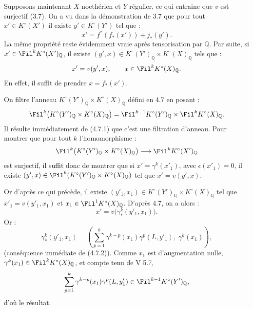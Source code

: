 Supposons maintenant \(X\) noethérien et \(Y\) régulier, ce qui entraine que \(v\) est surjectif (3.7). On a vu dans la démonstration de 3.7 que pour tout \(x'\in K^\circ(X')\) il existe \(y'\in K^\circ(Y')\) tel que :
\[
  x'=f^*(f_*(x'))+j_*(y').
\]
La même propriété reste évidemment vraie après tensorisation par \(\mathbb Q\). Par suite, si \(x'\in\Fil^kK^\circ(X')_{\mathbb Q}\), il existe \((y',x)\in K^\circ(Y')_{\mathbb Q}\times K^\circ(X)_{\mathbb Q}\) tels que :
\[
  x'=v(y',x),\qquad x\in\Fil^kK^\circ(X)_{\mathbb Q}.
\]
En effet, il suffit de prendre \(x=f_*(x')\).

On filtre l'anneau \(K^\circ(Y')_{\mathbb Q}\times K^\circ(X)_{\mathbb Q}\) défini en 4.7 en posant :
\[
  \Fil^k\bigl(K^\circ(Y')_{\mathbb Q}\times K^\circ(X)_{\mathbb Q}\bigr)
  =
  \Fil^{k-1}K^\circ(Y')_{\mathbb Q}\times \Fil^kK^\circ(X)_{\mathbb Q}.
\]
Il résulte immédiatement de (4.7.1) que c'est une filtration d'anneau. Pour montrer que pour tout \(k\) l'homomorphisme :
\[
  \Fil^k\bigl(K^\circ(Y')_{\mathbb Q}\times K^\circ(X)_{\mathbb Q}\bigr)
  \longrightarrow
  \Fil^kK^\circ(X')_{\mathbb Q}
\]
est surjectif, il suffit donc de montrer que si \(x'= \gamma^k(x'_1)\), avec \(\epsilon(x'_1)=0\), il existe \((y',x)\in\Fil^k(K^\circ(Y')_{\mathbb Q}\times K^\circ(X)_{\mathbb Q})\) tel que \(x'=v(y',x)\).

Or d'après ce qui précède, il existe \((y'_1,x_1)\in K^\circ(Y')_{\mathbb Q}\times K^\circ(X)_{\mathbb Q}\) tel que \(x'_1=v(y'_1,x_1)\) et \(x_1\in\Fil^1K^\circ(X)_{\mathbb Q}\). D'après 4.7, on a alors :
\[
  x'=v\bigl(\gamma^k_*(y'_1,x_1)\bigr).
\]
Or :
\[
  \gamma^k_*(y'_1,x_1)
  =
  \left(\sum_{p=1}^{k}\gamma^{k-p}(x_1)\gamma^p(L,y'_1),\;
  \gamma^k(x_1)\right),
\]
(conséquence immédiate de (4.7.2)). Comme \(x_1\) est d'augmentation nulle, \(\gamma^k(x_1)\in\Fil^kK^\circ(X)_{\mathbb Q}\), et compte tenu de V 5.7,
\[
  \sum_{p=1}^{k}\gamma^{k-p}(x_1)\gamma^p(L,y'_1)
  \in\Fil^{k-1}K^\circ(Y')_{\mathbb Q},
\]
d'où le résultat.

